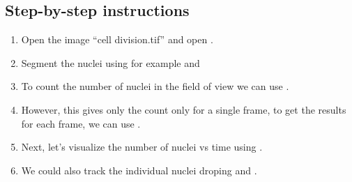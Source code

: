 \subsection*{Step-by-step instructions}

\begin{enumerate}
    \item Open the image ``cell division.tif'' and open .
    \item Segment the nuclei using for example  and 
    \item To count the number of nuclei in the field of view we can use  .
    \item However, this gives only the count only for a single frame, to get the results for each frame, we can use .
    \item Next, let's visualize the number of nuclei vs time using .
    \item We could also track the individual nuclei droping  and .
\end{enumerate}
